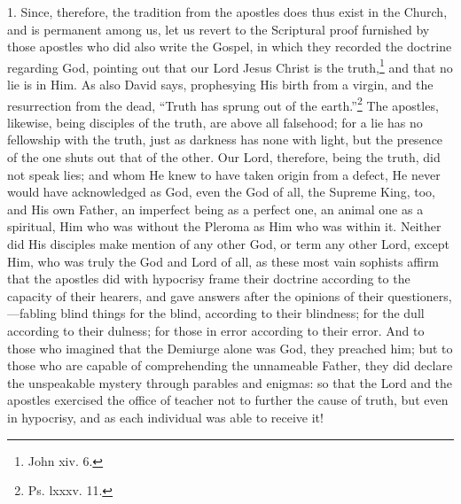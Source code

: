 1. Since, therefore, the tradition from the apostles does thus exist in the Church, and is permanent among us, let us revert to the Scriptural proof furnished by those apostles who did also write the Gospel, in which they recorded the doctrine regarding God, pointing out that our Lord Jesus Christ is the truth,\footnote{John xiv. 6.} and that no lie is in Him. As also David says, prophesying His birth from a virgin, and the resurrection from the dead, “Truth has sprung out of the earth.”\footnote{Ps. lxxxv. 11.} The apostles, likewise, being disciples of the truth, are above all falsehood; for a lie has no fellowship with the truth, just as darkness has none with light, but the presence of the one shuts out that of the other. Our Lord, therefore, being the truth, did not speak lies; and whom He knew to have taken origin from a defect, He never would have acknowledged as God, even the God of all, the Supreme King, too, and His own Father, an imperfect being as a perfect one, an animal one as a spiritual, Him who was without the Pleroma as Him who was within it.  Neither did His disciples make mention of any other God, or term any other Lord, except Him, who was truly the God and Lord of all, as these most vain sophists affirm that the apostles did with hypocrisy frame their doctrine according to the capacity of their hearers, and gave answers after the opinions of their questioners,—fabling blind things for the blind, according to their blindness; for the dull according to their dulness; for those in error according to their error. And to those who imagined that the Demiurge alone was God, they preached him; but to those who are capable of comprehending the unnameable Father, they did declare the unspeakable mystery through parables and enigmas: so that the Lord and the apostles exercised the office of teacher not to further the cause of truth, but even in hypocrisy, and as each individual was able to receive it!

